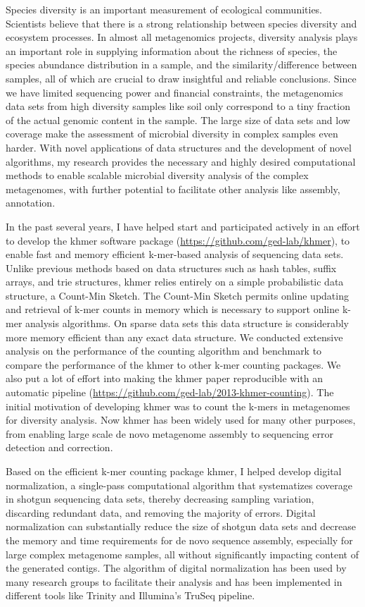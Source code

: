 \documentclass[12pt]{article}
\theoremstyle{plain} \numberwithin{equation}{section}
\theoremstyle{definition}
\newcounter{list}
\begin{document}
 Species diversity is an important measurement of ecological communities. Scientists 
believe that there is a strong relationship between species diversity and ecosystem processes.
 In almost all metagenomics projects, diversity analysis plays an important role in supplying information 
 about the richness of species, the species abundance
distribution in a sample, and the similarity/difference between 
samples, all of which are crucial to draw insightful and reliable conclusions. Since we have limited
 sequencing power and financial constraints, the metagenomics data sets from 
 high diversity samples like soil only correspond to a tiny fraction of the actual genomic
 content in the sample. The large size of data sets and low coverage make the assessment of microbial 
 diversity in complex samples even harder. With novel applications of data structures and the development 
 of novel algorithms, my research provides the necessary and highly desired computational methods to enable 
 scalable microbial diversity analysis of the complex metagenomes, with further potential to facilitate other analysis like assembly, annotation.


 In the past several years, I have helped start and participated actively in an effort to develop the khmer software package 
 (\url{https://github.com/ged-lab/khmer}), to enable fast and memory efficient k-mer-based analysis of sequencing data sets. 
 Unlike previous methods based on data structures such as hash tables, suffix arrays, and trie structures, khmer relies 
 entirely on a simple probabilistic data structure, a Count-Min Sketch. The Count-Min Sketch permits online updating and retrieval of k-mer counts in memory which is necessary to support online k-mer analysis algorithms. On sparse data sets this data structure is considerably more 
 memory efficient than any exact data structure.
 We conducted extensive  analysis on the performance of the counting algorithm and benchmark to compare the 
 performance of the khmer to other k-mer counting packages. 
  We also put a lot of effort into making the khmer paper reproducible with an automatic pipeline
   (\url{https://github.com/ged-lab/2013-khmer-counting}). The initial motivation of developing khmer was to count the 
   k-mers in metagenomes for diversity analysis. Now khmer has been widely used for many other purposes, from  
   enabling large scale de novo metagenome assembly  to sequencing error detection and correction.
  
 Based on the efficient k-mer counting package khmer, I helped develop digital normalization, a single-pass 
 computational algorithm that systematizes coverage in shotgun sequencing data sets, thereby decreasing sampling 
 variation, discarding redundant data, and removing the majority of errors. Digital normalization can substantially reduce 
 the size of shotgun data sets and decrease the memory and time requirements for de novo sequence assembly, 
 especially for large complex metagenome samples, all without significantly impacting content of the generated contigs. 
 The algorithm of digital normalization has been used by many research groups to facilitate their analysis and has been 
 implemented in different tools like Trinity and  Illumina's TruSeq pipeline.
\end{document}
